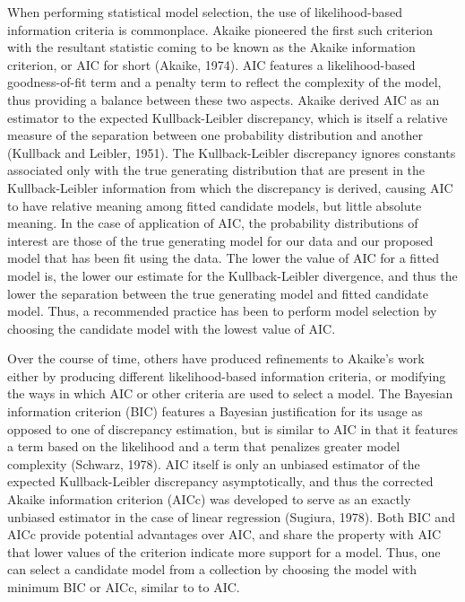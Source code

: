		When performing statistical model selection, the use of likelihood-based information criteria is commonplace. Akaike pioneered the first such criterion
		with the resultant statistic coming to be known as the Akaike information criterion, or AIC for short (Akaike, 1974). AIC features a likelihood-based goodness-of-fit term and a
		penalty term to reflect the complexity of the model, thus providing a balance between these two aspects. Akaike derived AIC as an estimator to the expected Kullback-Leibler discrepancy,
		which is itself a relative measure of the separation between one probability distribution and another (Kullback and Leibler, 1951). The Kullback-Leibler discrepancy ignores constants
		associated only with the true generating distribution that are present in the Kullback-Leibler information from which the discrepancy is derived, causing AIC to have relative meaning among
		fitted candidate models, but little absolute meaning. In the case of application of AIC, the probability distributions of interest are those of the true generating model
		for our data and our proposed model that has been fit using the data. The lower the value of AIC for a fitted model is, the lower our estimate for the Kullback-Leibler divergence,
		and thus the lower the separation between the true generating model and fitted candidate model. Thus, a recommended practice has been to perform model selection by choosing
		the candidate model with the lowest value of AIC.

		Over the course of time, others have produced refinements to Akaike's work either by producing different likelihood-based information criteria, or modifying the ways in which AIC or other
		criteria are used to select a model. The Bayesian information criterion (BIC) features a Bayesian justification for its usage as opposed to one of discrepancy estimation, but is similar to AIC in that
		it features a term based on the likelihood and a term that penalizes greater model complexity (Schwarz, 1978). AIC itself is only an unbiased estimator of the expected Kullback-Leibler discrepancy
		asymptotically, and thus the corrected Akaike information criterion (AICc) was developed to serve as an exactly unbiased estimator in the case of linear regression (Sugiura, 1978).
		Both BIC and AICc provide potential advantages over AIC, and share the property with AIC that lower values of the criterion indicate more support for a model. Thus, one can select a candidate model
		from a collection by choosing the model with minimum BIC or AICc, similar to to AIC.

